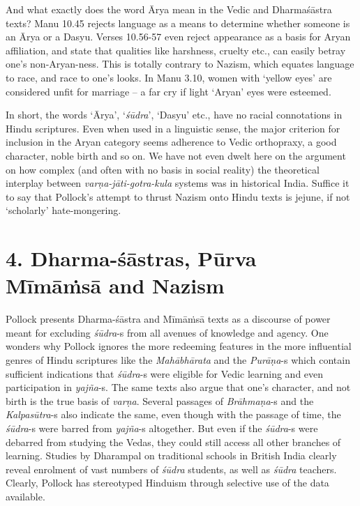 And what exactly does the word Ārya mean in the Vedic and Dharmaśāstra texts? Manu 10.45 rejects language as a means to determine whether someone is an Ārya or a Dasyu. Verses 10.56-57 even reject appearance as a basis for Aryan affiliation, and state that qualities like harshness, cruelty etc., can easily betray one’s non-Aryan-ness. This is totally contrary to Nazism, which equates language to race, and race to one’s looks. In Manu 3.10, women with ‘yellow eyes’ are considered unfit for marriage – a far cry if light ‘Aryan’ eyes were esteemed.

In short, the words ‘Ārya’, ‘\textit{śūdra}’, ‘Dasyu’ etc., have no racial connotations in Hindu scriptures. Even when used in a linguistic sense, the major criterion for inclusion in the Aryan category seems adherence to Vedic orthopraxy, a good character, noble birth and so on. We have not even dwelt here on the argument on how complex (and often with no basis in social reality) the theoretical interplay between \textit{varṇa-jāti-gotra-kula} systems was in historical India. Suffice it to say that Pollock’s attempt to thrust Nazism onto Hindu texts is jejune, if not ‘scholarly’ hate-mongering.


\section*{4. Dharma-śāstras, Pūrva Mīmāṁsā and Nazism}

Pollock presents Dharma-śāstra and Mīmāṁsā texts as a discourse of power meant for excluding \textit{śūdra}-s from all avenues of knowledge and agency. One wonders why Pollock ignores the more redeeming features in the more influential genres of Hindu scriptures like the \textit{Mahābhārata} and the \textit{Purāṇa}-s which contain sufficient indications that \textit{śūdra}-s were eligible for Vedic learning and even participation in \textit{yajña}-s. The same texts also argue that one’s character, and not birth is the true basis of \textit{varṇa}. Several passages of \textit{Brāhmaṇa}-s and the \textit{Kalpasūtra}-s also indicate the same, even though with the passage of time, the \textit{śūdra}-s were barred from \textit{yajña}-s altogether. But even if the \textit{śūdra}-s were debarred from studying the Vedas, they could still access all other branches of learning. Studies by Dharampal on traditional schools in British India clearly reveal enrolment of vast numbers of \textit{śūdra} students, as well as \textit{śūdra} teachers. Clearly, Pollock has stereotyped Hinduism through selective use of the data available.

